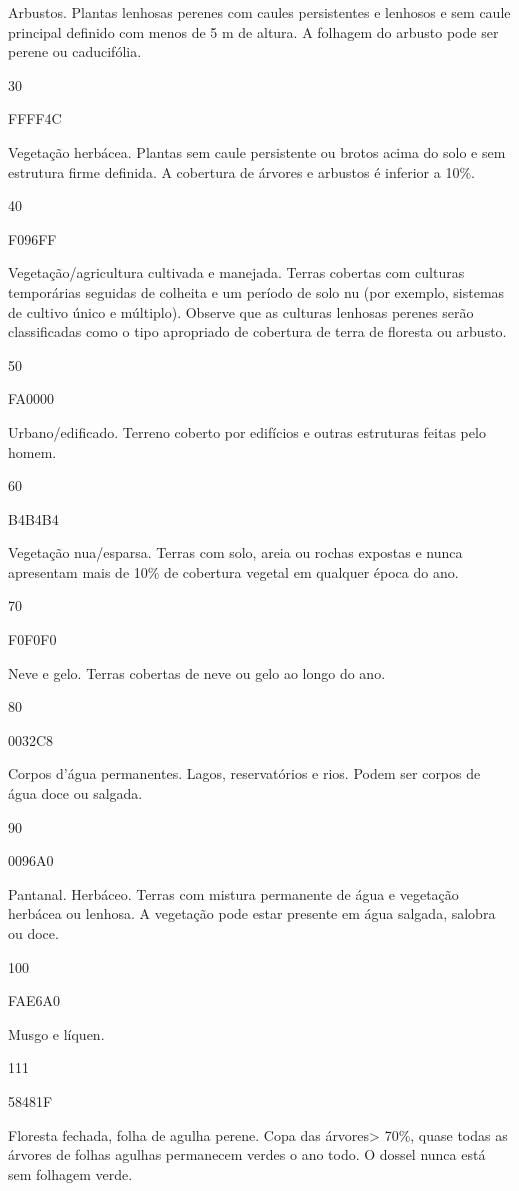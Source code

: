 \documentclass[
]{krantz}
\begin{document}
Arbustos. Plantas lenhosas perenes com caules persistentes e lenhosos e sem caule principal definido com menos de 5 m de altura. A folhagem do arbusto pode ser perene ou caducifólia.

30

FFFF4C

Vegetação herbácea. Plantas sem caule persistente ou brotos acima do solo e sem estrutura firme definida. A cobertura de árvores e arbustos é inferior a 10\%.

40

F096FF

Vegetação/agricultura cultivada e manejada. Terras cobertas com culturas temporárias seguidas de colheita e um período de solo nu (por exemplo, sistemas de cultivo único e múltiplo). Observe que as culturas lenhosas perenes serão classificadas como o tipo apropriado de cobertura de terra de floresta ou arbusto.

50

FA0000

Urbano/edificado. Terreno coberto por edifícios e outras estruturas feitas pelo homem.

60

B4B4B4

Vegetação nua/esparsa. Terras com solo, areia ou rochas expostas e nunca apresentam mais de 10\% de cobertura vegetal em qualquer época do ano.

70

F0F0F0

Neve e gelo. Terras cobertas de neve ou gelo ao longo do ano.

80

0032C8

Corpos d'água permanentes. Lagos, reservatórios e rios. Podem ser corpos de água doce ou salgada.

90

0096A0

Pantanal. Herbáceo. Terras com mistura permanente de água e vegetação herbácea ou lenhosa. A vegetação pode estar presente em água salgada, salobra ou doce.

100

FAE6A0

Musgo e líquen.

111

58481F

Floresta fechada, folha de agulha perene. Copa das árvores\textgreater{} 70\%, quase todas as árvores de folhas agulhas permanecem verdes o ano todo. O dossel nunca está sem folhagem verde.
\end{document}
